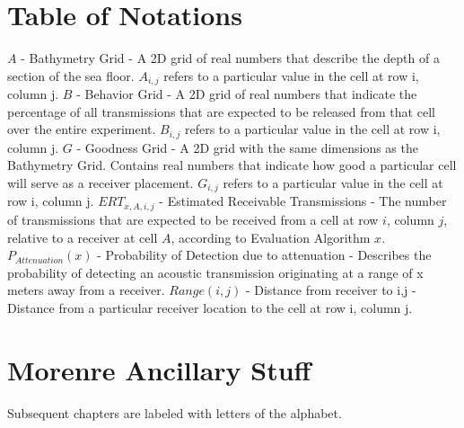 
\chapter{Table of Notations}
$A$ - Bathymetry Grid - A 2D grid of real numbers that describe the depth of a section of the sea floor.  $A_{i,j}$ refers to a particular value in the cell at row i, column j.
\newline
\newline
$B$ - Behavior Grid - A 2D grid of real numbers that indicate the percentage of all transmissions that are expected to be released from that cell over the entire experiment.  $B_{i,j}$ refers to a particular value in the cell at row i, column j.
\newline
\newline
$G$ - Goodness Grid - A 2D grid with the same dimensions as the Bathymetry Grid.  Contains real numbers that indicate how good a particular cell will serve as a receiver placement.  $G_{i,j}$ refers to a particular value in the cell at row i, column j.
\newline
\newline
$ERT_{x,A,i,j}$ - Estimated Receivable Transmissions - The number of transmissions that are expected to be received from a cell at row $i$, column $j$, relative to a receiver at cell $A$, according to Evaluation Algorithm $x$.
\newline
\newline
$P_{Attenuation}(x)$ - Probability of Detection due to attenuation - Describes the probability of detecting an acoustic transmission originating at a range of x meters away from a receiver.
\newline
\newline
$Range(i,j)$ - Distance from receiver to i,j - Distance from a particular receiver location to the cell at row i, column j.

\chapter{Morenre Ancillary Stuff}

Subsequent chapters are labeled with letters of the alphabet.
